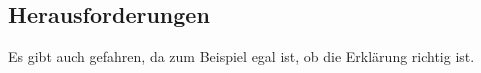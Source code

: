 \subsection{Herausforderungen}


Es gibt auch gefahren, da zum Beispiel egal ist, ob die Erklärung richtig ist.